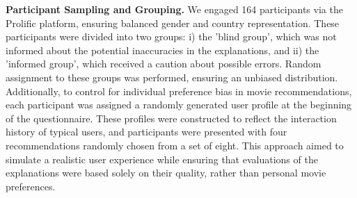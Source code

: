 \documentclass[sigconf]{acmart}
\begin{document}

\vspace{1mm} \noindent \textbf{Participant Sampling and Grouping.}
We engaged 164 participants via the Prolific platform, ensuring balanced gender and country representation. These participants were divided into two groups: i) the 'blind group', which was not informed about the potential inaccuracies in the explanations, and ii) the 'informed group', which received a caution about possible errors. Random assignment to these groups was performed, ensuring an unbiased distribution. Additionally, to control for individual preference bias in movie recommendations, each participant was assigned a randomly generated user profile at the beginning of the questionnaire. These profiles were constructed to reflect the interaction history of typical users, and participants were presented with four recommendations randomly chosen from a set of eight. This approach aimed to simulate a realistic user experience while ensuring that evaluations of the explanations were based solely on their quality, rather than personal movie preferences.
\end{document}
